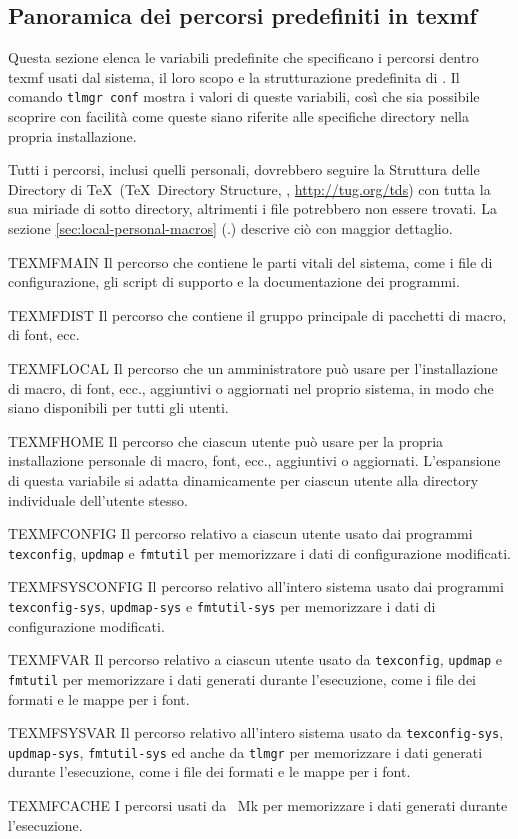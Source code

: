 \documentclass{article}
\begin{document}
\subsection{Panoramica dei percorsi predefiniti in texmf}
\label{sec:texmftrees}

Questa sezione elenca le variabili predefinite che specificano i percorsi
dentro texmf usati dal sistema, il loro scopo e la strutturazione
predefinita di \TL{}. Il comando \texttt{tlmgr~conf} mostra i valori di
queste variabili, così che sia possibile scoprire con facilità come queste
siano riferite alle specifiche directory nella propria installazione.

Tutti i percorsi, inclusi quelli personali, dovrebbero seguire la Struttura
delle Directory di \TeX\ (\TeX\ Directory Structure, \TDS,
\url{http://tug.org/tds}) con tutta la sua miriade di sotto directory,
altrimenti i file potrebbero non essere trovati. La sezione
\ref{sec:local-personal-macros} (\p.\pageref{sec:local-personal-macros})
descrive ciò con maggior dettaglio.

\begin{ttdescription}
\item [TEXMFMAIN] Il percorso che contiene le parti vitali del sistema,
  come i file di configurazione, gli script di supporto e la
  documentazione dei programmi.
\item [TEXMFDIST] Il percorso che contiene il gruppo principale di
  pacchetti di macro, di font, ecc.
\item [TEXMFLOCAL] Il percorso che un amministratore può usare per
  l'installazione di macro, di font, ecc., aggiuntivi o aggiornati nel
  proprio sistema, in modo che siano disponibili per tutti gli utenti.
\item [TEXMFHOME] Il percorso che ciascun utente può usare per la propria
  installazione personale di macro, font, ecc., aggiuntivi o aggiornati.
  L'espansione di questa variabile si adatta dinamicamente per ciascun
  utente alla directory individuale dell'utente stesso.
\item [TEXMFCONFIG] Il percorso relativo a ciascun utente usato dai
  programmi \verb+texconfig+, \verb+updmap+ e \verb+fmtutil+ per
  memorizzare i dati di configurazione modificati.
\item [TEXMFSYSCONFIG] Il percorso relativo all'intero sistema usato dai
  programmi \verb+texconfig-sys+, \verb+updmap-sys+ e \verb+fmtutil-sys+
  per memorizzare i dati di configurazione modificati.
\item [TEXMFVAR] Il percorso relativo a ciascun utente usato da
  \verb+texconfig+, \verb+updmap+ e \verb+fmtutil+ per memorizzare i dati
  generati durante l'esecuzione, come i file dei formati e le mappe per i
  font.
\item [TEXMFSYSVAR] Il percorso relativo all'intero sistema usato da
  \verb+texconfig-sys+, \verb+updmap-sys+, \verb+fmtutil-sys+ ed anche da
  \verb+tlmgr+ per memorizzare i dati generati durante l'esecuzione, come
  i file dei formati e le mappe per i font.
\item [TEXMFCACHE] I percorsi usati da \ConTeXt\ Mk per memorizzare
  i dati generati durante l'esecuzione.
\end{ttdescription}
\end{document}

